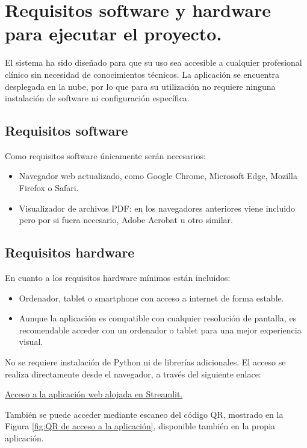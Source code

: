 \label{anexo:documentacion-usuario}

\section{Requisitos software y hardware para ejecutar el proyecto.}

El sistema ha sido diseñado para que su uso sea accesible a cualquier profesional clínico sin necesidad de conocimientos técnicos. La aplicación se encuentra desplegada en la nube, por lo que para su utilización no requiere ninguna instalación de software ni configuración específica.

\subsection{Requisitos software}
Como requisitos software únicamente serán necesarios:
\begin{itemize}
    \item Navegador web actualizado, como Google Chrome, Microsoft Edge, Mozilla Firefox o Safari. 
    \item Visualizador de archivos PDF: en los navegadores anteriores viene incluido pero por si fuera necesario, Adobe Acrobat u otro similar. 
\end{itemize}

\subsection{Requisitos hardware}
En cuanto a los requisitos hardware mínimos están incluidos:
\begin{itemize}
    \item Ordenador, tablet o smartphone con acceso a internet de forma estable.
    \item Aunque la aplicación es compatible con cualquier resolución de pantalla, es recomendable acceder con un ordenador o tablet para una mejor experiencia visual.
\end{itemize}

No se requiere instalación de Python ni de librerías adicionales. El acceso se realiza directamente desde el navegador, a través del siguiente enlace:

\href{https://tfg-marina-martin.streamlit.app}{Acceso a la aplicación web alojada en Streamlit.}

También se puede acceder mediante escaneo del código QR, mostrado en la Figura \ref{fig:QR de acceso a la aplicación}, disponible también en la propia aplicación.


